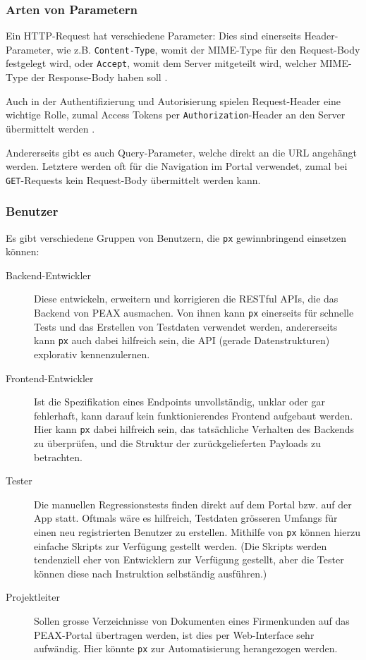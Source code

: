 \subsubsection{Arten von Parametern}

Ein HTTP-Request hat verschiedene Parameter: Dies sind einerseits Header-Parameter, wie z.B. \texttt{Content-Type}, womit der MIME-Type für den Request-Body festgelegt wird, oder \texttt{Accept}, womit dem Server mitgeteilt wird, welcher MIME-Type der Response-Body haben soll \cite{RFC2616}.

Auch in der Authentifizierung und Autorisierung spielen Request-Header eine wichtige Rolle, zumal Access Tokens per \texttt{Authorization}-Header an den Server übermittelt werden \cite[Kapitel 7.1]{RFC6794}.

Andererseits gibt es auch Query-Parameter, welche direkt an die URL angehängt werden. Letztere werden oft für die Navigation im Portal verwendet, zumal bei \texttt{GET}-Requests kein Request-Body übermittelt werden kann.

\subsubsection{Benutzer}
\label{sec:Benutzer}

Es gibt verschiedene Gruppen von Benutzern, die \texttt{px} gewinnbringend einsetzen können:

\begin{description}
    \item[Backend-Entwickler] Diese entwickeln, erweitern und korrigieren die RESTful APIs, die das Backend von PEAX ausmachen. Von ihnen kann \texttt{px} einerseits für schnelle Tests und das Erstellen von Testdaten verwendet werden, andererseits kann \texttt{px} auch dabei hilfreich sein, die API (gerade Datenstrukturen) explorativ kennenzulernen.
    \item[Frontend-Entwickler] Ist die Spezifikation eines Endpoints unvollständig, unklar oder gar fehlerhaft, kann darauf kein funktionierendes Frontend aufgebaut werden. Hier kann \texttt{px} dabei hilfreich sein, das tatsächliche Verhalten des Backends zu überprüfen, und die Struktur der zurückgelieferten Payloads zu betrachten.
    \item[Tester] Die manuellen Regressionstests finden direkt auf dem Portal bzw. auf der App statt. Oftmals wäre es hilfreich, Testdaten grösseren Umfangs für einen neu registrierten Benutzer zu erstellen. Mithilfe von \texttt{px} können hierzu einfache Skripts zur Verfügung gestellt werden. (Die Skripts werden tendenziell eher von Entwicklern zur Verfügung gestellt, aber die Tester können diese nach Instruktion selbständig ausführen.)
    \item[Projektleiter] Sollen grosse Verzeichnisse von Dokumenten eines Firmenkunden auf das PEAX-Portal übertragen werden, ist dies per Web-Interface sehr aufwändig. Hier könnte \texttt{px} zur Automatisierung herangezogen werden.
\end{description}

